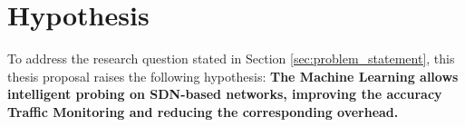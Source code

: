 \section{Hypothesis}
\label{sec:hypothesis}

To address the research question stated in Section \ref{sec:problem_statement}, this thesis proposal raises the following hypothesis: \textbf{The Machine Learning allows intelligent probing on SDN-based networks, improving the accuracy Traffic Monitoring and reducing the corresponding overhead.}